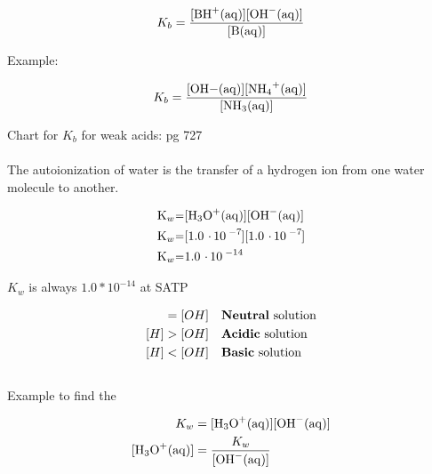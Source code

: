 \documentclass{article}
\begin{document}
\begin{paragraph}
\begin{center}
  \begin{equation}
    K_b =\ce{\frac{[BH^+(aq)][OH^-(aq)]}{[B(aq)]}}
  \end{equation}
  \end{center}
Example:\\
\begin{center}
\end{center}
\begin{align*}
K_b = \frac{\ce{[OH-(aq)][NH4+(aq)]}}{\ce{[NH3(aq)]}}
\end{align*}

\vspace{4mm}
Chart for $K_b$ for weak acids: pg 727
\\\\
The autoionization of water is the transfer of a hydrogen ion from one water molecule to another.

\begin{center}
\end{center}
\begin{center}
  \begin{align*}
    \ce{K_w&=[H3O+(aq)][OH^-(aq)]}\\
    \ce{K_w&=[1.0*10^-7][1.0*10^-7]}\\
    \ce{K_w&=1.0*10^-14}
  \end{align*}
\end{center}

\begin{center}
$K_w$ is always $1.0*10^{-14}$ at SATP\\
\end{center}
  
\vspace{1mm}

\begin{align*}
[H] &= [OH] && \text{\textbf  {Neutral} solution}\\
[H] &> [OH] && \text{\textbf {Acidic} solution}\\
[H] &< [OH] && \text{\textbf  {Basic} solution\hspace{3.3mm}}  \\
\end{align*}
\\
Example to find the \ce{[H3O^-(aq)]}

\begin{center}
  \begin{align*}
    K_w&=\ce{[H3O+(aq)][OH^-(aq)]}\\
    \ce{[H3O+(aq)]}&=\frac{K_w}{\ce{[OH^-(aq)]}}
  \end{align*}
\end{center}


\end{paragraph}
\end{document}
